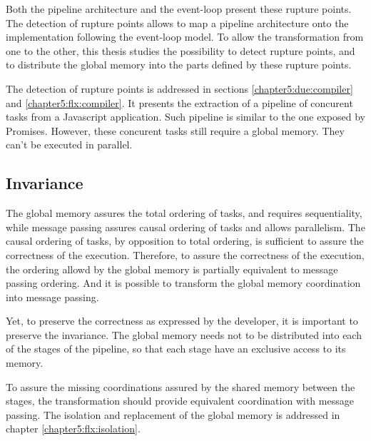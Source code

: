 Both the pipeline architecture and the event-loop present these rupture points.
The detection of rupture points allows to map a pipeline architecture onto the implementation following the event-loop model.
To allow the transformation from one to the other, this thesis studies the possibility to detect rupture points, and to distribute the global memory into the parts defined by these rupture points.

The detection of rupture points is addressed in sections \ref{chapter5:due:compiler} and \ref{chapter5:flx:compiler}.
It presents the extraction of a pipeline of concurent tasks from a Javascript application.
Such pipeline is similar to the one exposed by Promises.
However, these concurent tasks still require a global memory.
They can't be executed in parallel.

\subsection{Invariance}


The global memory assures the total ordering of tasks, and requires sequentiality, while message passing assures causal ordering of tasks and allows parallelism.
The causal ordering of tasks, by opposition to total ordering, is sufficient to assure the correctness of the execution.
Therefore, to assure the correctness of the execution, the ordering allowd by the global memory is partially equivalent to message passing ordering.
And it is possible to transform the global memory coordination into message passing.

Yet, to preserve the correctness as expressed by the developer, it is important to preserve the invariance.
The global memory needs not to be distributed into each of the stages of the pipeline, so that each stage have an exclusive access to its memory.

To assure the missing coordinations assured by the shared memory between the stages, the transformation should provide equivalent coordination with message passing.
The isolation and replacement of the global memory is addressed in chapter \ref{chapter5:flx:isolation}.




